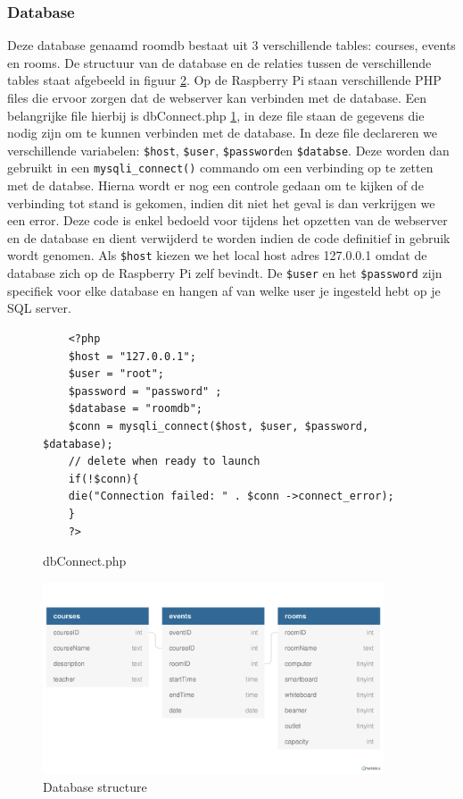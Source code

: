 \documentclass[a4paper,kul]{kulakarticle} %
\begin{document}
\subsubsection{Database}
Deze database genaamd roomdb bestaat uit 3 verschillende tables: courses, events en rooms. De structuur van de database en de relaties tussen de verschillende tables staat afgebeeld in figuur \ref{fig:dbstruct}. Op de Raspberry Pi staan verschillende PHP files die ervoor zorgen dat de webserver kan verbinden met de database. Een belangrijke file hierbij is dbConnect.php \ref{fig:dbconnect}, in deze file staan de gegevens die nodig zijn om te kunnen verbinden met de database. In deze  file declareren we verschillende variabelen: \verb|$host|, \verb|$user|, \verb|$password|en \verb|$databse|. Deze worden dan gebruikt in een \verb|mysqli_connect()| commando om een verbinding op te zetten met de databse. Hierna wordt er nog een controle gedaan om te kijken of de verbinding tot stand is gekomen, indien dit niet het geval is dan verkrijgen we een error. Deze code is enkel bedoeld voor tijdens het opzetten van de webserver en de database en dient verwijderd te worden indien de code definitief in gebruik wordt genomen. Als \verb|$host| kiezen we het local host adres 127.0.0.1 omdat de database zich op de Raspberry Pi zelf bevindt. De \verb|$user| en het \verb|$password| zijn specifiek voor elke database en hangen af van welke user je ingesteld hebt op je SQL server. 
\begin{figure}[h]
	\begin{verbatim}
	<?php
	$host = "127.0.0.1";
	$user = "root";
	$password = "password" ;
	$database = "roomdb";
	$conn = mysqli_connect($host, $user, $password, $database);
	// delete when ready to launch
	if(!$conn){
	die("Connection failed: " . $conn ->connect_error);
	}
	?>
	\end{verbatim}
	\caption{dbConnect.php}
	\label{fig:dbconnect}
\end{figure}
\newpage
\begin{figure}[h]
	\includegraphics[width=0.9\textwidth]{dbstruct}
	\caption{Database structure}
	\label{fig:dbstruct}
\end{figure}
\end{document}

